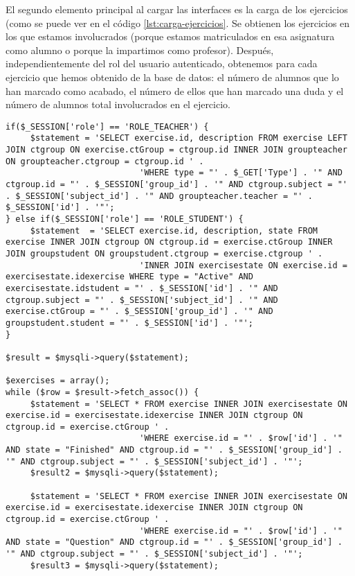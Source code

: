 El segundo elemento principal al cargar las interfaces es la carga de los ejercicios (como se puede ver en el código \ref{lst:carga-ejercicios}. Se obtienen los ejercicios en los que estamos involucrados (porque estamos matriculados en esa asignatura como alumno o porque la impartimos como profesor). Después, independientemente del rol del usuario autenticado, obtenemos para cada ejercicio que hemos obtenido de la base de datos: el número de alumnos que lo han marcado como acabado, el número de ellos que han marcado una duda y el número de alumnos total involucrados en el ejercicio.\\

\noindent
\begin{lstlisting}[caption=Cargar los ejercicios del tipo pasado por parámetro.,label={lst:carga-ejercicios}]
if($_SESSION['role'] == 'ROLE_TEACHER') {
     $statement = 'SELECT exercise.id, description FROM exercise LEFT JOIN ctgroup ON exercise.ctGroup = ctgroup.id INNER JOIN groupteacher ON groupteacher.ctgroup = ctgroup.id ' .
                           'WHERE type = "' . $_GET['Type'] . '" AND ctgroup.id = "' . $_SESSION['group_id'] . '" AND ctgroup.subject = "' . $_SESSION['subject_id'] . '" AND groupteacher.teacher = "' . $_SESSION['id'] . '"';
} else if($_SESSION['role'] == 'ROLE_STUDENT') {
     $statement  = 'SELECT exercise.id, description, state FROM exercise INNER JOIN ctgroup ON ctgroup.id = exercise.ctGroup INNER JOIN groupstudent ON groupstudent.ctgroup = exercise.ctgroup ' .
                           'INNER JOIN exercisestate ON exercise.id = exercisestate.idexercise WHERE type = "Active" AND exercisestate.idstudent = "' . $_SESSION['id'] . '" AND ctgroup.subject = "' . $_SESSION['subject_id'] . '" AND exercise.ctGroup = "' . $_SESSION['group_id'] . '" AND groupstudent.student = "' . $_SESSION['id'] . '"';
}

$result = $mysqli->query($statement);

$exercises = array();
while ($row = $result->fetch_assoc()) {
     $statement = 'SELECT * FROM exercise INNER JOIN exercisestate ON exercise.id = exercisestate.idexercise INNER JOIN ctgroup ON ctgroup.id = exercise.ctGroup ' .
                           'WHERE exercise.id = "' . $row['id'] . '" AND state = "Finished" AND ctgroup.id = "' . $_SESSION['group_id'] . '" AND ctgroup.subject = "' . $_SESSION['subject_id'] . '"';
     $result2 = $mysqli->query($statement);

     $statement = 'SELECT * FROM exercise INNER JOIN exercisestate ON exercise.id = exercisestate.idexercise INNER JOIN ctgroup ON ctgroup.id = exercise.ctGroup ' .
                           'WHERE exercise.id = "' . $row['id'] . '" AND state = "Question" AND ctgroup.id = "' . $_SESSION['group_id'] . '" AND ctgroup.subject = "' . $_SESSION['subject_id'] . '"';
     $result3 = $mysqli->query($statement);


\end{lstlisting}
